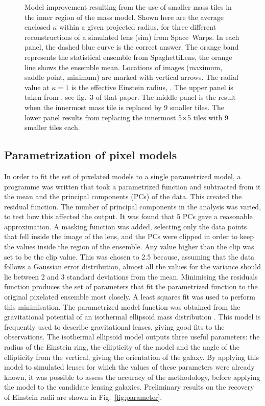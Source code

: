 \begin{figure}
  \caption{Model improvement resulting from the use of smaller mass tiles
    in the inner region of the mass model.  Shown here are the average
    enclosed $\kappa$ within a given projected radius, for three
    different reconstructions of a simulated lens (sim) from
    Space~Warps.  In each panel, the dashed blue curve is the correct
    answer.  The orange band represents the statistical ensemble from
    SpaghettiLens, the orange line shows the ensemble mean.  Locations of
    images (maximum, saddle point, minimum) are marked with vertical
    arrows.  The radial value at $\kappa=1$ is the effective
    Einstein radius, \ER. The upper panel is taken from
    \citet{2015MNRAS.447.2170K}, see fig.~3 of that paper.  The middle
    panel is the result when the innermost mass tile is replaced by 9
    smaller tiles.  The lower panel results from replacing the
    innermost 5$\times$5 tiles with 9 smaller tiles each.}
  \label{fig:subsampling}
\end{figure}

\subsection{Parametrization of pixel models} \label{subsec:parameter}

In order to fit the set of pixelated models to a single parametrized
model, a programme was written that took a parametrized function and
subtracted from it the mean and the principal components (PCs) of the
data. This created the residual function.  The number of principal
components in the analysis was varied, to test how this affected the
output. It was found that 5 PCs gave a reasonable approximation. A
masking function was added, selecting only the data points that fell
inside the image of the lens, and the PCs were clipped in order to
keep the values inside the region of the ensemble. Any value higher
than the clip was set to be the clip value. This was chosen to 2.5
because, assuming that the data follows a Gaussian error distribution,
almost all the values for the variance should lie between 2 and 3
standard deviations from the mean. Minimising the residuals function
produces the set of parameters that fit the parametrized function to
the original pixelated ensemble most closely.  A least squares fit was
used to perform this minimisation.  The parametrized model function
was obtained from the gravitational potential of an isothermal
ellipsoid mass distribution \citep{2001astro.ph..2341K}.  This model
is frequently used to describe gravitational lenses, giving good fits
to the observations.  The isothermal ellipsoid model outputs three
useful parameters: the radius of the Einstein ring, the ellipticity of
the model and the angle of the ellipticity from the vertical, giving
the orientation of the galaxy.  By applying this model to simulated
lenses for which the values of these parameters were already known, it
was possible to assess the accuracy of the methodology, before
applying the model to the candidate lensing galaxies.  Preliminary
results on the recovery of Einstein radii are shown in
Fig.~\ref{fig:parameter}.

